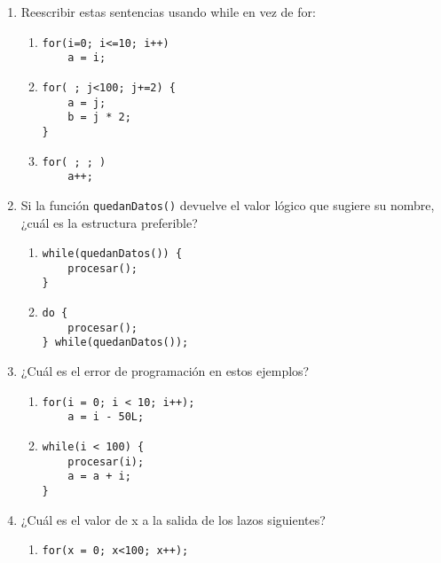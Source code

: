 \begin{enumerate}
\item Reescribir estas sentencias usando while en vez de for:
\begin{enumerate}[label=\alph*.]
	\item 
\begin{lstlisting}
for(i=0; i<=10; i++)
    a = i;
\end{lstlisting}

\item 
\begin{lstlisting}
for( ; j<100; j+=2) {
    a = j;
    b = j * 2;
}
\end{lstlisting}

\item 
\begin{lstlisting}
for( ; ; )
    a++;
\end{lstlisting}
\end{enumerate}

\item Si la función \lstinline{quedanDatos()} devuelve el valor lógico que sugiere su nombre,
¿cuál es la estructura preferible?
\begin{enumerate}[label=\alph*.]
\item 
\begin{lstlisting}
while(quedanDatos()) {
    procesar();
}
\end{lstlisting}

\item 
\begin{lstlisting}
do {
    procesar();
} while(quedanDatos());
\end{lstlisting}
\end{enumerate}
\item ¿Cuál es el error de programación en estos ejemplos?
	\begin{enumerate}[label=\alph*.]
\item 
\begin{lstlisting}
for(i = 0; i < 10; i++);
    a = i - 50L;
\end{lstlisting}

\item 
\begin{lstlisting}
while(i < 100) {
    procesar(i);
    a = a + i;
}
\end{lstlisting}
\end{enumerate}
\item ¿Cuál es el valor de x a la salida de los lazos siguientes?
	\begin{enumerate}[label=\alph*.]
	\item 
\begin{lstlisting}
for(x = 0; x<100; x++);
\end{lstlisting}


\end{enumerate}
\end{enumerate}
